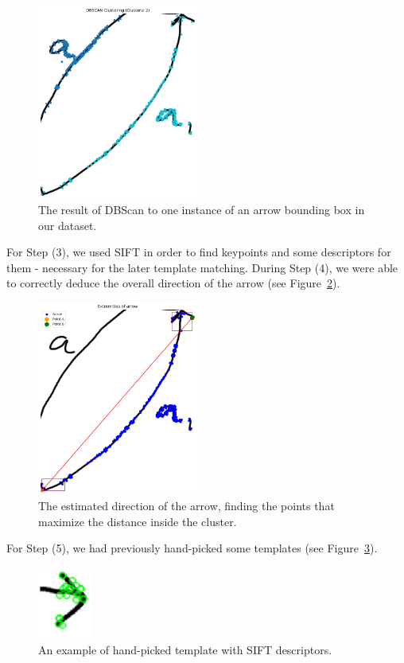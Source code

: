 \documentclass[conference]{IEEEtran}
\begin{document}
\begin{appendices}
\begin{figure}[H]
	\centering
	\includegraphics[width=150pt]{arrow_double_clustering_clusters.png}
	\caption{The result of DBScan to one instance of an arrow bounding box in our dataset.}
	\label{fig:arrow_double_clustering_clusters}
\end{figure}

For Step (3), we used SIFT in order to find keypoints and some descriptors for them - necessary for the later template matching.
During Step (4), we were able to correctly deduce the overall direction of the arrow (see Figure~\ref{fig:arrow_double_clustering_direction}).

\begin{figure}[H]
	\centering
	\includegraphics[width=150pt]{arrow_double_clustering_direction.png}
	\caption{The estimated direction of the arrow, finding the points that maximize the distance inside the cluster.}
	\label{fig:arrow_double_clustering_direction}
\end{figure}

For Step (5), we had previously hand-picked some templates (see Figure~\ref{fig:templates}).

\begin{figure}[H]
	\centering
	\includegraphics[width=50pt]{templates.png}
	\caption{An example of hand-picked template with SIFT descriptors.}
	\label{fig:templates}
\end{figure}


\end{appendices}
\end{document}

